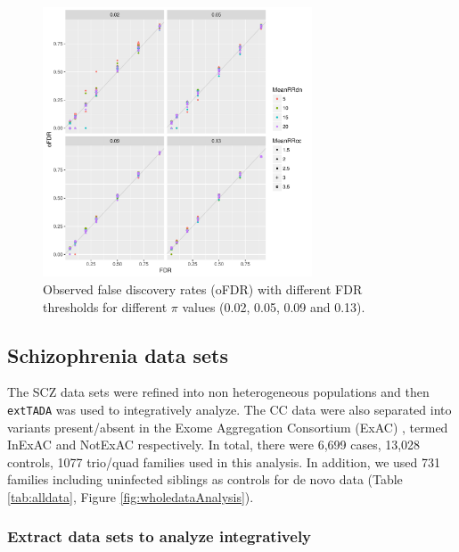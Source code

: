 \documentclass[]{article}
\begin{document}
\begin{figure}[ht]
\centering
\includegraphics[width=\textwidth,height=8cm]{Picture/FDRandcFDRforDNandCC.pdf}
\caption{Observed false discovery rates (oFDR) with different FDR
  thresholds for different $\pi$ values (0.02, 0.05, 0.09 and 0.13). }
\label{fig:TPRandFPRforDNandCConeClass}
\end{figure}

\FloatBarrier
\subsection{Schizophrenia data sets}

The SCZ data sets were refined into non heterogeneous populations and then
\texttt{extTADA} was used to integratively analyze. The CC data were
also separated into variants present/absent in the  Exome Aggregation Consortium
(ExAC) \citep{lek2015analysis}, termed InExAC and NotExAC respectively. In
total, there were 6,699 cases, 13,028 controls, 1077 trio/quad
families used in this analysis. In addition, we used 731 families
including uninfected siblings as controls for de novo data (Table
\ref{tab:alldata}, Figure \ref{fig:wholedataAnalysis}).

\subsubsection{Extract data sets to analyze integratively}
\end{document}
